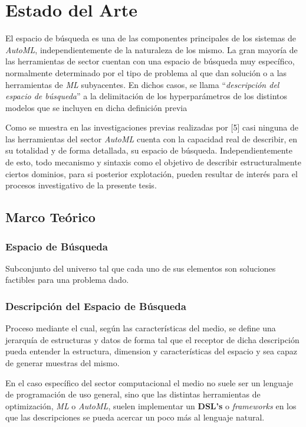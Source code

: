 \chapter{Estado del Arte}\label{chapter:state-of-the-art}


El espacio de búsqueda es una de las componentes principales de los sistemas
de {\it AutoML}, independientemente de la naturaleza de los mismo. La gran mayoría
de las herramientas de sector cuentan con una espacio de búsqueda muy específico,
normalmente determinado por el tipo de problema al que dan solución o a las
herramientas de {\it ML} subyacentes. En dichos casos, se llama ``{\it descripción
del espacio de búsqueda}'' a la delimitación de los hyperparámetros de los
distintos modelos que se incluyen en dicha definición previa

Como se muestra en las investigaciones previas realizadas por [5] casi ninguna
de las herramientas del sector {\it AutoML} cuenta con la capacidad real de describir,
en su totalidad y de forma detallada, su espacio de búsqueda. Independientemente
de esto, todo mecanismo y sintaxis como el objetivo de describir estructuralmente
ciertos dominios, para si posterior explotación, pueden resultar de interés para
el procesos investigativo de la presente tesis.

\section{Marco Teórico}

\subsection{Espacio de Búsqueda}

Subconjunto del universo tal que cada uno de sus elementos son soluciones factibles
para una problema dado.

\subsection{Descripción del Espacio de Búsqueda}


Proceso mediante el cual, según las características del medio, se define una
jerarquía de estructuras y datos de forma tal que el receptor de dicha descripción
pueda entender la estructura, dimension y características del espacio y sea capaz
de generar muestras del mismo.

En el caso específico del sector computacional el medio no suele ser un lenguaje
de programación de uso general, sino que las distintas herramientas de optimización,
{\it ML} o {\it AutoML}, suelen implementar un {\bf DSL's} o {\it frameworks} en los
que las descripciones se pueda acercar un poco más al lenguaje natural.

